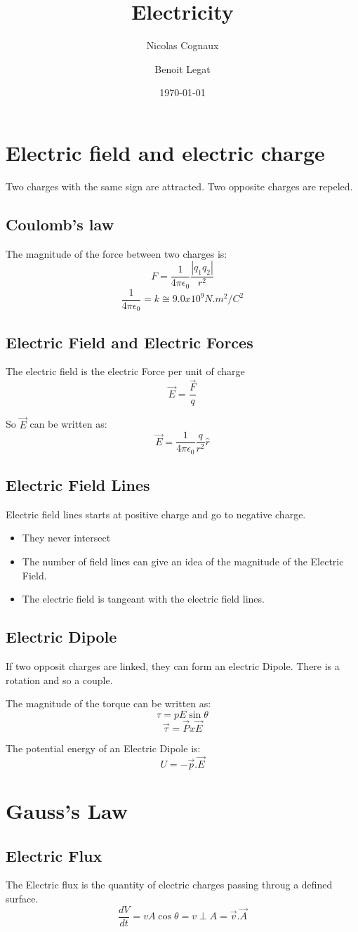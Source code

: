 \documentclass[11pt,a4paper,french]{article}
\title{Electricity}
\author{Nicolas Cognaux \and Benoit Legat}
\date{\today}
\begin{document}
\maketitle

\section{Electric field and electric charge}
Two charges with the same sign are attracted. Two opposite charges are repeled.

\subsection{Coulomb's law}
The magnitude of the force between two charges is:
$$ F = \frac{1}{4\pi\epsilon_0}\frac{|q_1q_2|}{r^2} $$
$$ \frac{1}{4\pi\epsilon_0} = k \cong 9.0x10^9N.m^2/C^2$$


\subsection{Electric Field and Electric Forces}
The electric field is the electric Force per unit of charge
$$ \vec{E} = \frac{\vec{F}}{q} $$

So $\vec{E}$ can be written as:
$$ \vec{E} = \frac{1}{4\pi\epsilon_0}\frac{q}{r^2}\hat{r} $$

\subsection{Electric Field Lines}
Electric field lines starts at positive charge and go to negative charge.

\begin{itemize}
\item They never intersect
\item The number of field lines can give an idea of the magnitude of the Electric Field.
\item The electric field is tangeant with the electric field lines.
\end{itemize}

\subsection{Electric Dipole}
If two opposit charges are linked, they can form an electric Dipole. There is a rotation and so a couple.

The magnitude of the torque can be written as:
$$ \tau = pE\sin{\theta} $$
$$\vec{\tau} = \vec{P}x\vec{E} $$

The potential energy of an Electric Dipole is:
$$ U = -\vec{p}. \vec{E} $$

\section{Gauss's Law}
\subsection{Electric Flux}
The Electric flux is the quantity of electric charges passing throug a defined surface.
$$ \frac{dV}{dt} = vA\cos{\theta} = v \perp A = \vec{v}.\vec{A} $$
\end{document}
